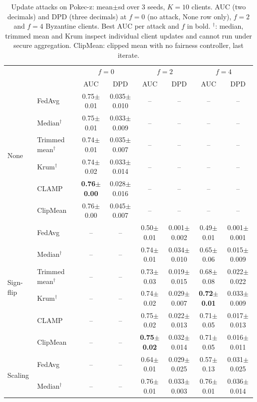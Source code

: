 \begin{table}[tbp]
\centering
\scriptsize
\setlength{\tabcolsep}{2pt}
\caption{Update attacks on Pokec-z: mean$\pm$sd over 3 seeds, $K=10$ clients. AUC (two decimals) and DPD (three decimals) at $f=0$ (no attack, None row only), $f=2$ and $f=4$ Byzantine clients. Best AUC per attack and $f$ in bold. $^\dagger$: median, trimmed mean and Krum inspect individual client updates and cannot run under secure aggregation. ClipMean: clipped mean with no fairness controller, last iterate.}
\label{tab:e3_pokec}
\begin{tabular}{llcccccc}
\toprule
 & & \multicolumn{2}{c}{$f=0$} & \multicolumn{2}{c}{$f=2$} & \multicolumn{2}{c}{$f=4$} \\
 & & AUC & DPD & AUC & DPD & AUC & DPD \\
\midrule
\multirow{6}{*}{None} & FedAvg & 0.75$\pm$0.01 & 0.035$\pm$0.010 & -- & -- & -- & -- \\
 & Median$^\dagger$ & 0.75$\pm$0.01 & 0.033$\pm$0.009 & -- & -- & -- & -- \\
 & Trimmed mean$^\dagger$ & 0.74$\pm$0.01 & 0.035$\pm$0.007 & -- & -- & -- & -- \\
 & Krum$^\dagger$ & 0.74$\pm$0.02 & 0.033$\pm$0.014 & -- & -- & -- & -- \\
 & CLAMP & \textbf{0.76$\pm$0.00} & 0.028$\pm$0.016 & -- & -- & -- & -- \\
 & ClipMean & 0.76$\pm$0.00 & 0.045$\pm$0.007 & -- & -- & -- & -- \\
\midrule
\multirow{6}{*}{Sign-flip} & FedAvg & -- & -- & 0.50$\pm$0.01 & 0.001$\pm$0.002 & 0.49$\pm$0.01 & 0.001$\pm$0.001 \\
 & Median$^\dagger$ & -- & -- & 0.74$\pm$0.01 & 0.034$\pm$0.010 & 0.65$\pm$0.06 & 0.015$\pm$0.009 \\
 & Trimmed mean$^\dagger$ & -- & -- & 0.73$\pm$0.03 & 0.019$\pm$0.015 & 0.68$\pm$0.08 & 0.022$\pm$0.022 \\
 & Krum$^\dagger$ & -- & -- & 0.74$\pm$0.02 & 0.029$\pm$0.007 & \textbf{0.72$\pm$0.01} & 0.033$\pm$0.009 \\
 & CLAMP & -- & -- & 0.75$\pm$0.02 & 0.022$\pm$0.013 & 0.71$\pm$0.05 & 0.017$\pm$0.013 \\
 & ClipMean & -- & -- & \textbf{0.75$\pm$0.02} & 0.032$\pm$0.014 & 0.71$\pm$0.05 & 0.016$\pm$0.011 \\
\midrule
\multirow{6}{*}{Scaling} & FedAvg & -- & -- & 0.64$\pm$0.01 & 0.029$\pm$0.025 & 0.57$\pm$0.13 & 0.031$\pm$0.025 \\
 & Median$^\dagger$ & -- & -- & 0.76$\pm$0.01 & 0.033$\pm$0.003 & 0.76$\pm$0.01 & 0.036$\pm$0.014 \\

\end{tabular}
\end{table}

